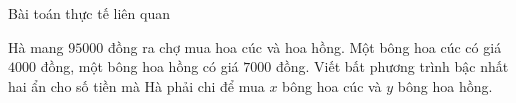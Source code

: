 			
\begin{dang}{Bài toán thực tế liên quan}
	
\end{dang}
\viduminhhoa
\begin{vd}%
	Hà mang $95000$ đồng ra chợ mua hoa cúc và hoa hồng. Một bông hoa cúc có giá $4000$ đồng, một bông hoa hồng có giá $7000$ đồng. Viết bất phương trình bậc nhất hai ẩn cho số tiền mà Hà phải chi để mua $x$ bông hoa cúc và $y$ bông hoa hồng.  
\end{vd}

